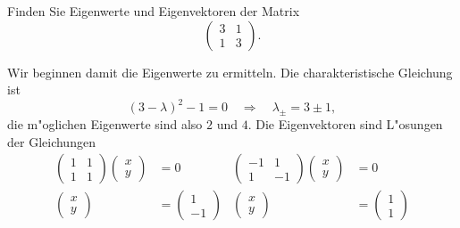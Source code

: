 Finden Sie Eigenwerte und Eigenvektoren der Matrix
\[
\begin{pmatrix}
3&1\\
1&3
\end{pmatrix}.
\]

\begin{loesung}
Wir beginnen damit die Eigenwerte zu ermitteln.
Die charakteristische Gleichung ist
\[
(3-\lambda)^2-1=0\quad\Rightarrow\quad\lambda_{\pm}=3\pm 1,
\]
die m"oglichen Eigenwerte sind also $2$ und $4$. Die Eigenvektoren sind
L"osungen der Gleichungen
\begin{align*}
\begin{pmatrix}1&1\\1&1\end{pmatrix}\begin{pmatrix}x\\y\end{pmatrix}&=0
&
\begin{pmatrix}-1&1\\1&-1\end{pmatrix}\begin{pmatrix}x\\y\end{pmatrix}&=0
\\
\begin{pmatrix}x\\y\end{pmatrix}&=\begin{pmatrix}1\\-1\end{pmatrix}
&
\begin{pmatrix}x\\y\end{pmatrix}&=\begin{pmatrix}1\\1\end{pmatrix}
\end{align*}
\end{loesung}

